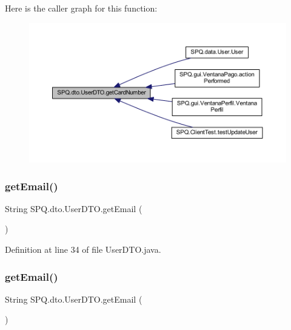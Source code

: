 Here is the caller graph for this function\+:
\nopagebreak
\begin{figure}[H]
\begin{center}
\leavevmode
\includegraphics[width=350pt]{class_s_p_q_1_1dto_1_1_user_d_t_o_a6ffd8dce998a3e1756aa82e7b2981dd4_icgraph}
\end{center}
\end{figure}
\mbox{\label{class_s_p_q_1_1dto_1_1_user_d_t_o_a67038ab8bab7cb7119ece00bcb20a360}} 
\subsubsection{\texorpdfstring{get\+Email()}{getEmail()}\hspace{0.1cm}{\footnotesize\ttfamily [1/3]}}
{\footnotesize\ttfamily String S\+P\+Q.\+dto.\+User\+D\+T\+O.\+get\+Email (\begin{DoxyParamCaption}{ }\end{DoxyParamCaption})}



Definition at line 34 of file User\+D\+T\+O.\+java.

\mbox{\label{class_s_p_q_1_1dto_1_1_user_d_t_o_a67038ab8bab7cb7119ece00bcb20a360}} 
\subsubsection{\texorpdfstring{get\+Email()}{getEmail()}\hspace{0.1cm}{\footnotesize\ttfamily [2/3]}}
{\footnotesize\ttfamily String S\+P\+Q.\+dto.\+User\+D\+T\+O.\+get\+Email (\begin{DoxyParamCaption}{ }\end{DoxyParamCaption})}




